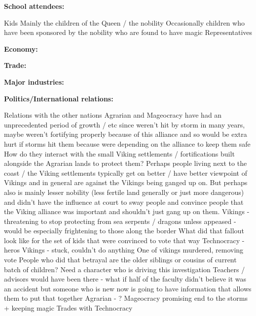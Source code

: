 \documentclass[blue]{GL2020}
\begin{document}
\textbf{School attendees:}

Kids
Mainly the children of the Queen / the nobility
Occasionally children who have been sponsored by the nobility who are found to have magic
Representatives

\textbf{Economy:}

\textbf{Trade:}

\textbf{Major industries:}

\textbf{Politics/International relations:}

Relations with the other nations
Agrarian and Mageocracy have had an unprecedented period of growth / etc since weren’t hit by storm in many years, maybe weren’t fortifying properly because of this alliance and so would be extra hurt if storms hit them because were depending on the alliance to keep them safe
How do they interact with the small Viking settlements / fortifications built alongside the Agrarian lands to protect them?  Perhaps people living next to the coast / the Viking settlements typically get on better / have better viewpoint of Vikings and in general are against the Vikings being ganged up on.  But perhaps also is mainly lesser nobility (less fertile land generally or just more dangerous) and didn’t have the influence at court to sway people and convince people that the Viking alliance was important and shouldn’t just gang up on them.  
Vikings - threatening to stop protecting from sea serpents / dragons unless appeased - would be especially frightening to those along the border
What did that fallout look like for the set of kids that were convinced to vote that way
Technocracy - heros
Vikings - stuck, couldn’t do anything
One of vikings murdered, removing vote
People who did that betrayal are the older siblings or cousins of current batch of children?
Need a character who is driving this investigation
Teachers / advisors would have been there - what if half of the faculty didn’t believe it was an accident but someone who is new now is going to have information that allows them to put that together
Agrarian - ?
Mageocracy promising end to the storms + keeping magic 
Trades with Technocracy
\end{document}

